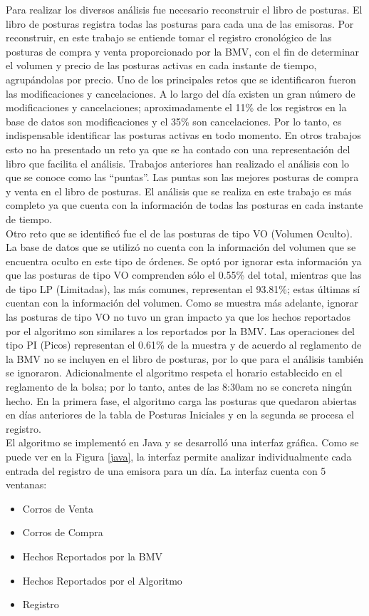 \documentclass[11pt]{article}
\numberwithin{equation}{section} %
\begin{document}
Para realizar los diversos análisis fue necesario reconstruir el libro de posturas. El libro de posturas registra todas las posturas para cada una de las emisoras. Por reconstruir, en este trabajo se entiende tomar el registro cronológico de las posturas de compra y venta proporcionado por la BMV, con el fin de determinar el volumen y precio de las posturas activas en cada instante de tiempo, agrupándolas por precio. Uno de los principales retos que se identificaron fueron las modificaciones y cancelaciones. A lo largo del día existen un gran número de modificaciones y cancelaciones; aproximadamente el 11\% de los registros en la base de datos son modificaciones y el 35\% son cancelaciones. Por lo tanto, es indispensable identificar las posturas activas en todo momento. En otros trabajos esto no ha presentado un reto ya que se ha contado con una representación del libro que facilita el análisis. Trabajos anteriores \cite{biais1995,Cont2010,zhao2010} han realizado el análisis con lo que se conoce como las ``puntas''. Las puntas son las mejores posturas de compra y venta en el libro de posturas. El análisis que se realiza en este trabajo es más completo ya que cuenta con la información de todas las posturas en cada instante de tiempo.\\

Otro reto que se identificó fue el de las posturas de tipo VO (Volumen Oculto). La base de datos que se utilizó no cuenta con la información del volumen que se encuentra oculto en este tipo de órdenes. Se optó por ignorar esta información ya que las posturas de tipo VO comprenden sólo el 0.55\% del total, mientras que las de tipo LP (Limitadas), las más comunes, representan el 93.81\%; estas últimas sí cuentan con la información del volumen. Como se muestra más adelante, ignorar las posturas de tipo VO no tuvo un gran impacto ya que los hechos reportados por el algoritmo son similares a los reportados por la BMV. Las operaciones del tipo PI (Picos) representan el 0.61\% de la muestra y de acuerdo al reglamento de la BMV no se incluyen en el libro de posturas, por lo que para el análisis también se ignoraron. Adicionalmente el algoritmo respeta el horario establecido en el reglamento de la bolsa; por lo tanto, antes de las 8:30am no se concreta ningún hecho. En la primera fase, el algoritmo carga las posturas que quedaron abiertas en días anteriores de la tabla de Posturas Iniciales y en la segunda se procesa el registro.\\

El algoritmo se implementó en Java y se desarrolló una interfaz gráfica. Como se puede ver en la Figura \ref{java}, la interfaz permite analizar individualmente cada entrada del registro de una emisora para un día. La interfaz cuenta con 5 ventanas:
\begin{itemize}
  \item Corros de Venta
  \item Corros de Compra
  \item Hechos Reportados por la BMV
  \item Hechos Reportados por el Algoritmo
  \item Registro
\end{itemize}
\end{document}
